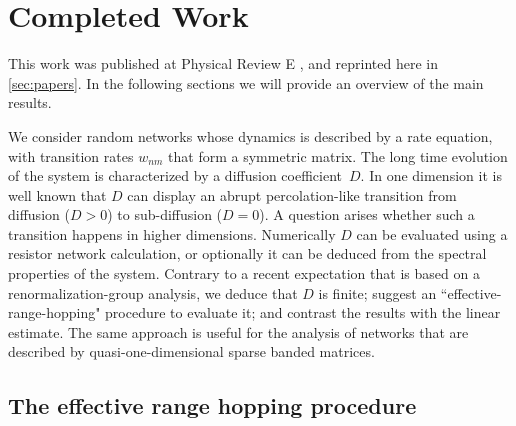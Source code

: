 \chapter{Completed Work}


This work was published at Physical Review E \cite{de_leeuw_diffusion_2012},
and reprinted here in \autoref{sec:papers}. In the
following sections we will provide an overview
of the main results.









We consider random networks whose dynamics is
described by a rate equation, with transition rates $w_{nm}$
that form a symmetric matrix. The long time evolution
of the system is characterized by a diffusion coefficient~$D$.
In one dimension it is well known that $D$ can display an abrupt
percolation-like transition from diffusion (${D>0}$)
to sub-diffusion (${D=0}$). A question arises whether
such a transition happens in higher dimensions.
Numerically $D$ can be evaluated using a resistor network
calculation, or optionally it can be deduced from 
the spectral properties of the system. Contrary to a recent 
expectation that is based on a renormalization-group analysis, 
we deduce that $D$ is finite; 
suggest an ``effective-range-hopping" procedure to evaluate it;
and contrast the results with the linear estimate.
The same approach is useful for the analysis of 
networks that are described by quasi-one-dimensional  
sparse banded matrices. 


\section{The effective range hopping procedure}


